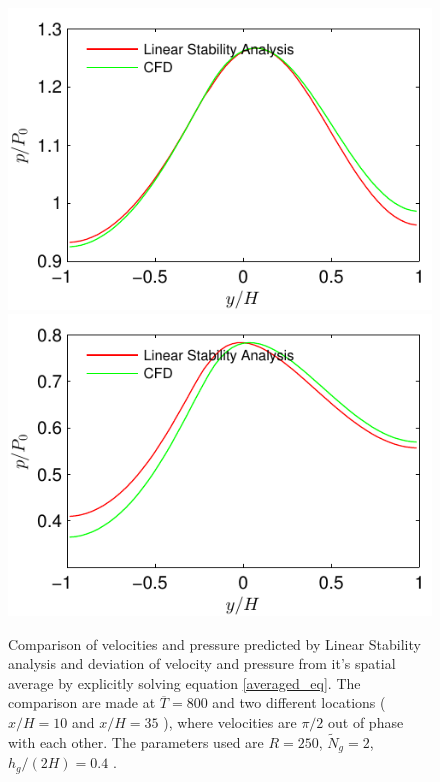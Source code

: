\documentclass[12pt]{report}   %
\newcommand{\Ndg}{\tilde{N}_g}
\renewcommand{\bar}{\overline}
\begin{document}
\begin{figure}
\centerline{\includegraphics{LinearStabilityVsCFD_Saturated_p_phase0} \includegraphics{LinearStabilityVsCFD_Saturated_p_phase90}}
\caption [Comparison of velocities and pressure predicted by Linear Stability analysis and deviation of velocity and pressure from it's spatial average by explicitly solving equation \eqref{averaged_eq}. ] {Comparison of velocities and pressure predicted by Linear Stability analysis and deviation of velocity and pressure from it's spatial average by explicitly solving equation \eqref{averaged_eq}. The comparison are made at $\bar{T}=800$ and two different locations ($x/H=10$ and $x/H=35$ ), where velocities are $\pi/2$ out of phase with each other. The parameters used are $R=250$, $\Ndg=2$, $h_g/(2H)=0.4$ . }
\label{CFDVsLinearStabilitySaturated}
\end{figure}
\end{document}

